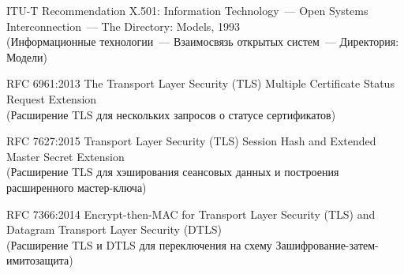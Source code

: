 \begin{thebibliography}{999}
ITU-T Recommendation X.501: 
Information Technology~--- Open Systems Interconnection~--- 
The Directory: Models, 1993\\ 
{\small (Информационные технологии~--– Взаимосвязь открытых систем~---
Директория: Модели)}

RFC 6961:2013
The Transport Layer Security (TLS) Multiple Certificate Status 
Request Extension\\
{\small (Расширение TLS для нескольких запросов о статусе сертификатов)}

RFC 7627:2015
Transport Layer Security (TLS) Session Hash and Extended Master Secret 
Extension\\
{\small (Расширение TLS для хэширования сеансовых данных и построения 
расширенного мастер-ключа)}

RFC 7366:2014
Encrypt-then-MAC for Transport Layer Security (TLS) and Datagram Transport 
Layer Security (DTLS)\\
{\small (Расширение TLS и DTLS для переключения на схему 
Зашифрование-затем-имитозащита)} 

\label{LastBib}
\end{thebibliography}


